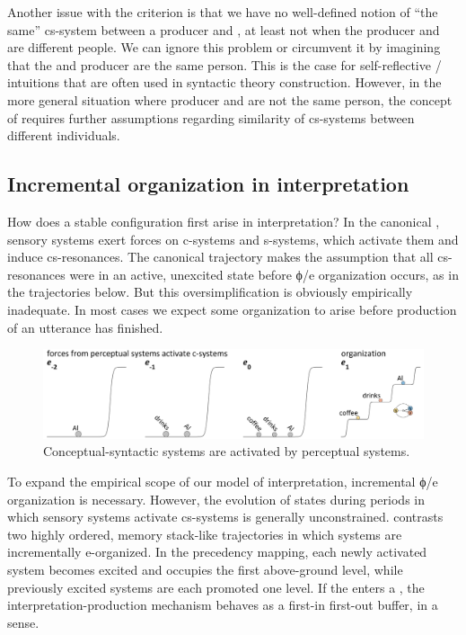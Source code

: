   Another issue with the  criterion is that we have no well-defined notion of “the same” cs-sys\-tem between a producer and , at least not when the producer and  are different people. We can ignore this problem or circumvent it by imagining that the  and producer are the same person. This is the case for self-reflective / intuitions that are often used in syntactic theory construction. However, in the more general situation where producer and  are not the same person, the concept of  requires further assumptions regarding similarity of cs-sys\-tems between different individuals.  

\subsection{Incremental organization in interpretation}

How does a stable configuration first arise in interpretation? In the canonical , sensory systems exert forces on c-sys\-tems and s-sys\-tems, which activate them and induce cs-resonances. The canonical trajectory makes the assumption that all cs-resonances were in an active, unexcited state before ϕ/e organization occurs, as in the trajectories below. But this oversimplification is obviously empirically inadequate. In most cases we expect some organization to arise before production of an utterance has finished.

  
\begin{figure}
\includegraphics[width=\textwidth]{figures/Tilsen-img127.png}
\caption{Conceptual-syntactic systems are activated by perceptual systems.}
\label{fig:6:8}
\end{figure}

 

  To expand the empirical scope of our model of interpretation, incremental ϕ/e organization is necessary. However, the evolution of states during periods in which sensory systems activate cs-sys\-tems is generally unconstrained. {} contrasts two highly ordered, memory stack-like trajectories in which systems are incrementally e-organized. In the precedency mapping, each newly activated system becomes excited and occupies the first above-ground level, while previously excited systems are each promoted one level. If the  enters a , the interpretation-production mechanism behaves as a first-in first-out buffer, in a sense. 


